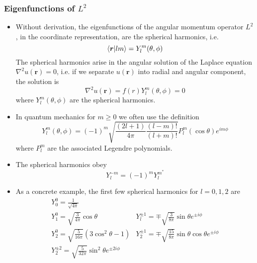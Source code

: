 \documentclass[11pt, a4paper]{article}
\renewcommand{\laplacian}{\nabla^{2}}
\renewcommand{\vec}[1]{\bm{#1}}  %
\renewcommand{\r}{\vec{r}}  %
\begin{document}
\subsubsection{Eigenfunctions of $ L^{2} $}
\begin{itemize}
	\item Without derivation, the eigenfunctions of the angular momentum operator $ L^{2} $, in the coordinate representation, are the spherical harmonics, i.e.
	\begin{equation*}
		\braket{\r}{lm} = Y_{l}^{m}(\theta, \phi) 
	\end{equation*}
	The spherical harmonics arise in the angular solution of the Laplace equation $ \laplacian u(\r) = 0 $, i.e. if we separate $ u(\r) $ into radial and angular component, the solution is
	\begin{equation*}
		\laplacian u(\r) = f(r)Y_{l}^{m}(\theta, \phi) = 0
	\end{equation*}
	where $ Y_{l}^{m}(\theta, \phi)  $ are the spherical harmonics. 
	
	\item In quantum mechanics for $ m \geq 0  $ we often use the definition
	\begin{equation*}
		Y_{l}^{m}(\theta, \phi) = (-1)^{m}\sqrt{\frac{(2l+1)}{4\pi}\frac{(l-m)!}{(l+m)!}} P_{l}^{m}(\cos \theta)e^{im\phi}
	\end{equation*}
	where $ P_{l}^{m} $ are the associated Legendre polynomials.
	
	\item The spherical harmonics obey 
	\begin{equation*}
		Y_{l}^{-m} = (-1)^{m}Y_{l}^{m^{*}}
	\end{equation*}
	
	\item As a concrete example, the first few spherical harmonics for $ l = 0, 1, 2 $ are
	\[
		\begin{array}{ll}
			Y_{0}^{0} = \frac{1}{\sqrt{4\pi}} &\\
			Y_{1}^{0} = \sqrt{\frac{3}{4\pi}}\cos \theta & Y_{l}^{\pm 1} = \mp \sqrt{\frac{3}{8\pi}}\sin \theta e^{\pm i \phi}\\
			Y_{2}^{0} = \sqrt{\frac{5}{16\pi}}  (3\cos^{2}\theta - 1) & Y_{2}^{\pm 1} = \mp \sqrt{\frac{15}{8\pi}}\sin \theta \cos \theta e^{\pm i \phi}\\
			Y_{2}^{\pm 2} = \sqrt{\frac{5}{32\pi}}\sin^{2}\theta e^{\pm 2i \phi}
		\end{array}
	\]
\end{itemize}
\end{document}
